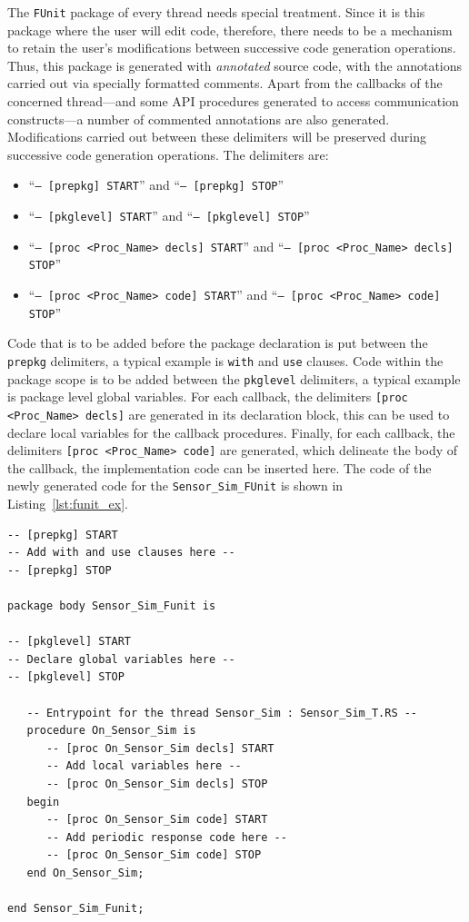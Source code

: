 The \texttt{FUnit} package of every thread needs special
treatment. Since it is this package where the user will edit code,
therefore, there needs to be a mechanism to retain the user's
modifications between successive code generation operations. Thus,
this package is generated with \emph{annotated} source code, with the
annotations carried out via specially formatted comments. Apart from
the callbacks of the concerned thread---and some API procedures
generated to access communication constructs---a number of commented
annotations are also generated. Modifications carried out between
these delimiters will be preserved during successive code generation
operations. The delimiters are:

\begin{itemize}
\item{``\texttt{-- [prepkg] START}'' and ``\texttt{-- [prepkg]
    STOP}''}
\item{``\texttt{-- [pkglevel] START}'' and ``\texttt{-- [pkglevel]
    STOP}''}
\item{``\texttt{-- [proc <Proc\_Name> decls] START}'' and ``\texttt{-- [proc
      <Proc\_Name> decls] STOP}''}
\item{``\texttt{-- [proc <Proc\_Name> code] START}'' and ``\texttt{-- [proc
      <Proc\_Name> code] STOP}''}
\end{itemize}

Code that is to be added before the package declaration is put between
the \texttt{prepkg} delimiters, a typical example is \texttt{with} and
\texttt{use} clauses. Code within the package scope is to be added
between the \texttt{pkglevel} delimiters, a typical example is package
level global variables. For each callback, the delimiters \texttt{[proc
<Proc\_Name> decls]} are generated in its declaration block, this can
be used to declare local variables for the callback
procedures. Finally, for each callback, the delimiters \texttt{[proc
    <Proc\_Name> code]} are generated, which delineate the body of the
callback, the implementation code can be inserted here. The code of
the newly generated code for the \texttt{Sensor\_Sim\_FUnit} is shown
in Listing~\ref{lst:funit_ex}.

\begin{minipage}{\listingwidth}
\flushleft
\lstset{language=ada}
\begin{lstlisting}[label=lst:funit_ex, caption=A newly generated
    functional unit for a periodic thread]
-- [prepkg] START
-- Add with and use clauses here --
-- [prepkg] STOP

package body Sensor_Sim_Funit is

-- [pkglevel] START
-- Declare global variables here --
-- [pkglevel] STOP

   -- Entrypoint for the thread Sensor_Sim : Sensor_Sim_T.RS --
   procedure On_Sensor_Sim is
      -- [proc On_Sensor_Sim decls] START
      -- Add local variables here --
      -- [proc On_Sensor_Sim decls] STOP
   begin
      -- [proc On_Sensor_Sim code] START
      -- Add periodic response code here --
      -- [proc On_Sensor_Sim code] STOP
   end On_Sensor_Sim;

end Sensor_Sim_Funit;
\end{lstlisting}
\end{minipage}

